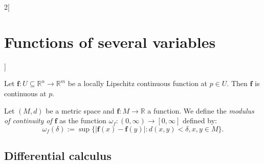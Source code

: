 \documentclass[class=article,10pt,crop=false]{standalone}
\begin{document}
\begin{multicols}{2}[\section{Functions of several variables}]
\begin{prop}
Let $\mathbf{\boldsymbol{f}}:U\subseteq\mathbb{R}^n\rightarrow\mathbb{R}^m$ be a locally Lipschitz continuous function at $p\in U$. Then $\mathbf{\boldsymbol{f}}$ is continuous at $p$.
\end{prop}
\begin{definition}
Let $(M,d)$ be a metric space and $\boldsymbol{f}:M\rightarrow\mathbb{R}$ a function. We define the \textit{modulus of continuity of $\boldsymbol{f}$} as the function $\omega_f:(0,\infty)\rightarrow[0,\infty]$ defined by: $$\omega_f(\delta):=\sup\{|\boldsymbol{f}(x)-\boldsymbol{f}(y)|:d(x,y)<\delta, x,y\in M\}.$$
\end{definition}
\subsection{Differential calculus}

\end{multicols}
\end{document}
